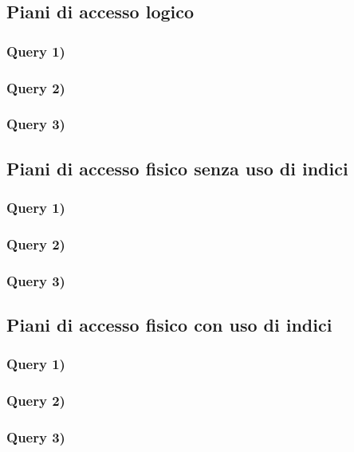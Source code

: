 \documentclass[a4paper,12pt]{article}
\begin{document}
 \subsection{ Piani di accesso logico }

 \subsubsection{ Query 1) }

 \subsubsection{ Query 2) }

 \subsubsection{ Query 3) }

 \subsection{ Piani di accesso fisico senza uso di indici }

 \subsubsection{ Query 1) }

 \subsubsection{ Query 2) }

 \subsubsection{ Query 3) }

 \subsection{ Piani di accesso fisico con uso di indici }

 \subsubsection{ Query 1) }

 \subsubsection{ Query 2) }

 \subsubsection{ Query 3) }
\end{document}
